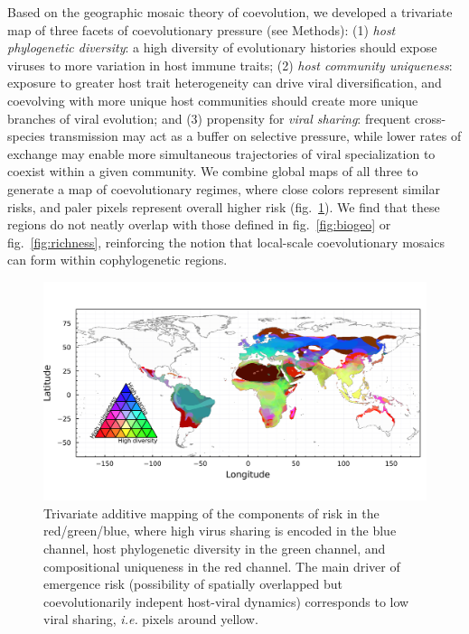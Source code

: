 \documentclass[11pt]{article}
\makeatletter
\def\maxwidth{\ifdim\Gin@nat@width>\linewidth\linewidth
\else\Gin@nat@width\fi}
\let\Oldincludegraphics\includegraphics
\renewcommand{\includegraphics}[1]{\Oldincludegraphics[width=\maxwidth]{#1}}
\makeatother
\begin{document}
Based on the geographic mosaic theory of coevolution, we developed a
trivariate map of three facets of coevolutionary pressure (see Methods):
(1) \emph{host phylogenetic diversity}: a high diversity of evolutionary
histories should expose viruses to more variation in host immune traits;
(2) \emph{host community uniqueness}: exposure to greater host trait
heterogeneity can drive viral diversification, and coevolving with more
unique host communities should create more unique branches of viral
evolution; and (3) propensity for \emph{viral sharing}: frequent
cross-species transmission may act as a buffer on selective pressure,
while lower rates of exchange may enable more simultaneous trajectories
of viral specialization to coexist within a given community. We combine
global maps of all three to generate a map of coevolutionary regimes,
where close colors represent similar risks, and paler pixels represent
overall higher risk (fig.~\ref{fig:trivariate}). We find that these
regions do not neatly overlap with those defined in
fig.~\ref{fig:biogeo} or fig.~\ref{fig:richness}, reinforcing the notion
that local-scale coevolutionary mosaics can form within cophylogenetic
regions.

\begin{figure}
\hypertarget{fig:trivariate}{%
\centering
\includegraphics{figures/risk_trivariate.png}
\caption{Trivariate additive mapping of the components of risk in the
red/green/blue, where high virus sharing is encoded in the blue channel,
host phylogenetic diversity in the green channel, and compositional
uniqueness in the red channel. The main driver of emergence risk
(possibility of spatially overlapped but coevolutionarily indepent
host-viral dynamics) corresponds to low viral sharing, \emph{i.e.}
pixels around yellow.}\label{fig:trivariate}
}
\end{figure}
\end{document}
